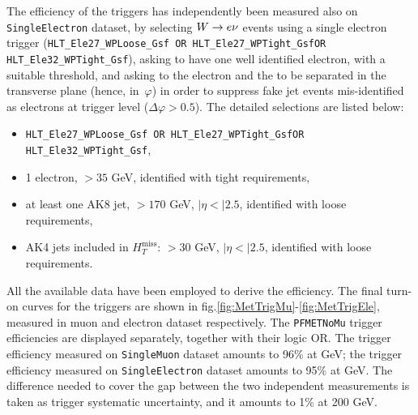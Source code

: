 \vspace*{1\baselineskip}

\noindent The efficiency of the \MET triggers has independently been measured also on {\tt SingleElectron} dataset, by selecting $W \rightarrow e \nu$ events using a single electron trigger ({\tt HLT\_Ele27\_WPLoose\_Gsf OR HLT\_Ele27\_WPTight\_GsfOR HLT\_Ele32\_WPTight\_Gsf}), asking to have one well identified electron, with a suitable \pt threshold, and asking to the electron and the \met to be separated in the transverse plane (hence, in~$\varphi$) in order to suppress fake jet events mis-identified as electrons at trigger level ($\Delta \varphi > 0.5$). The detailed selections are listed below:
\begin{itemize}
\item {\tt HLT\_Ele27\_WPLoose\_Gsf OR HLT\_Ele27\_WPTight\_GsfOR HLT\_Ele32\_WPTight\_Gsf},
\item 1 electron, \pt$>35$ GeV, identified with tight requirements,
\item at least one AK8 jet, \pt$>170$ GeV, $|\eta<|2.5$, identified with loose requirements,
\item AK4 jets included in ${H}_T^{\text{miss}}$: \pt$>30$ GeV, $|\eta<|2.5$, identified with loose requirements.
\end{itemize}

\noindent All the available data have been employed to derive the efficiency. The final turn-on curves for the \MET triggers are shown in fig.\ref{fig:MetTrigMu}-\ref{fig:MetTrigEle}, measured in muon and electron dataset respectively. The {\tt PFMETNoMu} trigger efficiencies are displayed separately, together with their logic OR. The trigger efficiency measured on {\tt SingleMuon} dataset amounts to 96\% at  GeV; the trigger efficiency measured on {\tt SingleElectron} dataset amounts to 95\% at  GeV. The difference needed to cover the gap between the two independent measurements is taken as trigger systematic uncertainty, and it amounts to 1\% at 200 GeV.

